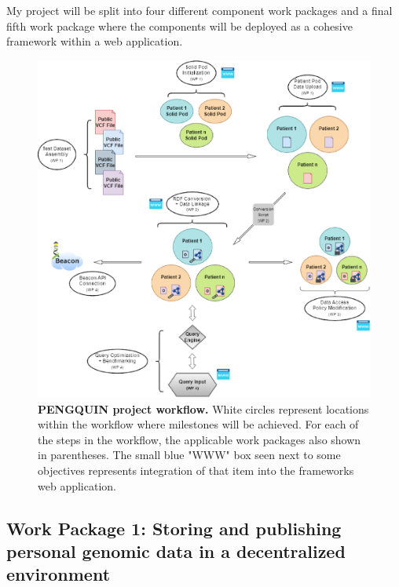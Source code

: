\documentclass[runningheads]{llncs}
\begin{document}
My project will be split into four different component work packages and a final fifth work package where the components will be deployed as a cohesive framework within a web application. 

\begin{figure}
\includegraphics[width=\textwidth]{fig1.eps}
\caption{\textbf{PENGQUIN project workflow.}
White circles represent locations within the workflow where milestones will be achieved. 
For each of the steps in the workflow, the applicable work packages also shown in parentheses. 
The small blue "WWW" box seen next to some objectives represents integration of that item into the framework\textquotesingle s web application.
} \label{fig1}
\end{figure}

\subsection{Work Package 1: Storing and publishing personal genomic data in a decentralized environment} 
\end{document}
